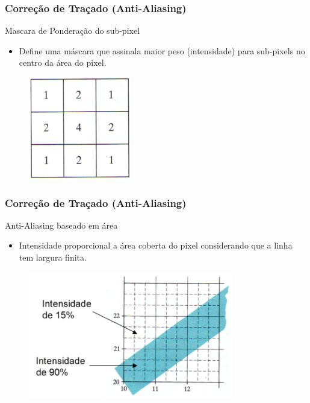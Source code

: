 \documentclass{beamer}
\begin{document}
\begin{frame}
\frametitle{Correção de Traçado (Anti-Aliasing)}
	\begin{block}{Mascara de Ponderação do sub-pixel}
		\begin{itemize}
			\item Define uma máscara que assinala maior peso (intensidade) para sub-pixels no centro da área do pixel.
		\end{itemize}
	\end{block}

	\begin{figure}[!h]
			\begin{center}
				\includegraphics[width=0.4\textwidth]{Figures/SubPix}
			\end{center}
		\end{figure}
\end{frame}

\begin{frame}
\frametitle{Correção de Traçado (Anti-Aliasing)}
	\begin{block}{Anti-Aliasing baseado em área}
		\begin{itemize}
			\item Intensidade proporcional a área coberta do pixel considerando que a linha tem largura finita.
		\end{itemize}
	\end{block}

	\begin{figure}[!h]
			\begin{center}
				\includegraphics[width=0.8\textwidth]{Figures/IntSubPix}
			\end{center}
		\end{figure}
\end{frame}
\end{document}
